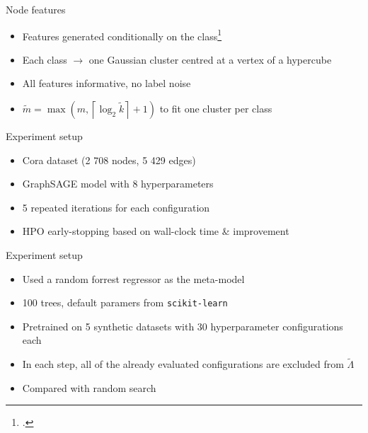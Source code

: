 \documentclass[10pt, aspectratio=169]{beamer}
\begin{document}
\begin{frame}{Node features}
	\begin{itemize}
		\item Features generated conditionally on the class\footcite{guyon_design_2003}
		\item Each class \( \rightarrow \) one Gaussian cluster centred at a vertex of a hypercube
		\item All features informative, no label noise
		\item \( \tilde{m} = \max \left( m, \left\lceil \log_2 \tilde{k} \right\rceil + 1 \right) \) to fit one cluster per class
	\end{itemize}
	\vspace{1em}
\end{frame}

\begin{frame}{Experiment setup}
	\begin{itemize}
		\item Cora dataset (2 708 nodes, 5 429 edges)
		\item GraphSAGE model with 8 hyperparameters
		\item 5 repeated iterations for each configuration
		\item HPO early-stopping based on wall-clock time \& improvement
	\end{itemize}
\end{frame}

\begin{frame}{Experiment setup}
	\begin{itemize}
		\item Used a random forrest regressor as the meta-model
		\item 100 trees, default paramers from \texttt{scikit-learn}
		\item Pretrained on 5 synthetic datasets with 30 hyperparameter configurations each
		\item In each step, all of the already evaluated configurations are excluded from \( \tilde{\Lambda} \)
		\item Compared with random search
	\end{itemize}
\end{frame}
\end{document}
